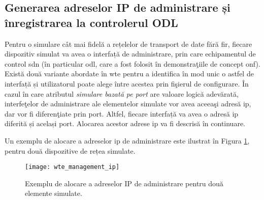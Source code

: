 \subsection{Generarea adreselor IP de administrare și înregistrarea la controlerul ODL}

Pentru o simulare cât mai fidelă a rețelelor de transport de date fără fir, fiecare dispozitiv simulat va avea o interfață de administrare, prin care echipamentul de control \gls{sdn} (în particular \gls{odl}, care a fost folosit în demonstraţiile de concept \gls{onf}). Există două variante abordate în \gls{wte} pentru a identifica în mod unic o astfel de interfață și utilizatorul poate alege între acestea prin fişierul de configurare. În cazul în care atributul \textit{simulare bazată pe port} are valoare logică adevărată, interfeţelor de administrare ale elementelor simulate vor avea aceeaşi adresă \gls{ip}, dar vor fi diferenţiate prin port. Altfel, fiecare interfață va avea o adresă \gls{ip} diferită și același port. Alocarea acestor adrese \gls{ip} va fi descrisă în continuare.

Un exemplu de alocare a adreselor \gls{ip} de administrare este ilustrat în Figura \ref{fig:wte_management_ip}, pentru două dispozitive de rețea simulate.

\begin{figure}[h]
	\centering
	\texttt{[image: wte\_management\_ip]}
	\caption{Exemplu de alocare a adreselor IP de administrare pentru două elemente simulate.}
	\label{fig:wte_management_ip}
\end{figure}

